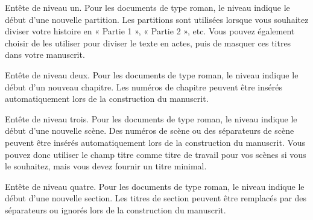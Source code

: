 \documentclass[a4paper,11pt,french]{sphinxmanual}
\begin{document}
\begin{description}
\sphinxAtStartPar
En\sphinxhyphen{}tête de niveau un. Pour les documents de type roman, le niveau indique le début d’une nouvelle partition. Les partitions sont utilisées lorsque vous souhaitez diviser votre histoire en « Partie 1 », « Partie 2 », etc. Vous pouvez également choisir de les utiliser pour diviser le texte en actes, puis de masquer ces titres dans votre manuscrit.

\sphinxAtStartPar
En\sphinxhyphen{}tête de niveau deux. Pour les documents de type roman, le niveau indique le début d’un nouveau chapitre. Les numéros de chapitre peuvent être insérés automatiquement lors de la construction du manuscrit.

\sphinxAtStartPar
En\sphinxhyphen{}tête de niveau trois. Pour les documents de type roman, le niveau indique le début d’une nouvelle scène. Des numéros de scène ou des séparateurs de scène peuvent être insérés automatiquement lors de la construction du manuscrit. Vous pouvez donc utiliser le champ titre comme titre de travail pour vos scènes si vous le souhaitez, mais vous devez fournir un titre minimal.

\sphinxAtStartPar
En\sphinxhyphen{}tête de niveau quatre. Pour les documents de type roman, le niveau indique le début d’une nouvelle section. Les titres de section peuvent être remplacés par des séparateurs ou ignorés lors de la construction du manuscrit.

\end{description}
\end{document}
